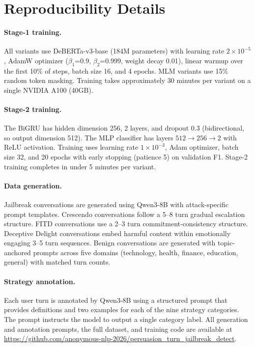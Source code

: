 \section{Reproducibility Details}
\label{sec:reproducibility}

\paragraph{Stage-1 training.}
All variants use DeBERTa-v3-base (184M parameters) with learning rate $2 \times 10^{-5}$, AdamW optimizer ($\beta_1$=0.9, $\beta_2$=0.999, weight decay 0.01), linear warmup over the first 10\% of steps, batch size 16, and 4 epochs. MLM variants use 15\% random token masking. Training takes approximately 30 minutes per variant on a single NVIDIA A100 (40GB).

\paragraph{Stage-2 training.}
The BiGRU has hidden dimension 256, 2 layers, and dropout 0.3 (bidirectional, so output dimension 512). The MLP classifier has layers $512 \to 256 \to 2$ with ReLU activation. Training uses learning rate $1 \times 10^{-3}$, Adam optimizer, batch size 32, and 20 epochs with early stopping (patience 5) on validation F1. Stage-2 training completes in under 5 minutes per variant.

\paragraph{Data generation.}
Jailbreak conversations are generated using Qwen3-8B with attack-specific prompt templates. Crescendo conversations follow a 5--8 turn gradual escalation structure. FITD conversations use a 2--3 turn commitment-consistency structure. Deceptive Delight conversations embed harmful content within emotionally engaging 3--5 turn sequences. Benign conversations are generated with topic-anchored prompts across five domains (technology, health, finance, education, general) with matched turn counts.

\paragraph{Strategy annotation.}
Each user turn is annotated by Qwen3-8B using a structured prompt that provides definitions and two examples for each of the nine strategy categories. The prompt instructs the model to output a single category label. All generation and annotation prompts, the full dataset, and training code are available at \url{https://github.com/anonymous-nlp-2026/persuasion_turn_jailbreak_detect}.


